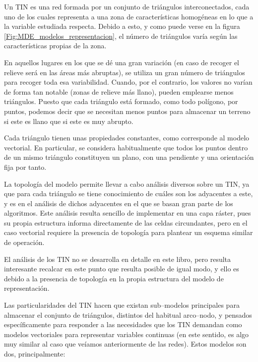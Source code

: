 \begin{multicols}{2}
Un TIN \cite{Peuker1978ASP} es una red formada por un conjunto de triángulos interconectados, cada uno de los cuales representa a una zona de características homogéneas en lo que a la variable estudiada respecta. Debido a esto, y como puede verse en la figura \ref{Fig:MDE_modelos_representacion}, el número de triángulos varía según las características propias de la zona. 

En aquellos lugares en los que se dé una gran variación (en caso de recoger el relieve será en las áreas más abruptas), se utiliza un gran número de triángulos para recoger toda esa variabilidad. Cuando, por el contrario, los valores no varían de forma tan notable (zonas de relieve más llano), pueden emplearse menos triángulos. Puesto que cada triángulo está formado, como todo polígono, por puntos, podemos decir que se necesitan menos puntos para almacenar un terreno si este es llano que si este es muy abrupto.

Cada triángulo tienen unas propiedades constantes, como corresponde al modelo vectorial. En particular, se considera habitualmente que todos los puntos dentro de un mismo triángulo constituyen un plano, con una pendiente y una orientación fija por tanto.

La topología del modelo permite llevar a cabo análisis diversos sobre un TIN, ya que para cada triángulo se tiene conocimiento de cuáles son los adyacentes a este, y es en el análisis de dichos adyacentes en el que se basan gran parte de los algoritmos. Este análisis resulta sencillo de implementar en una capa ráster, pues su propia estructura informa directamente de las celdas circundantes, pero en el caso vectorial requiere la presencia de topología para plantear un esquema similar de operación. 

El análisis de los TIN no se desarrolla en detalle en este libro, pero resulta interesante recalcar en este punto que resulta posible de igual modo, y ello es debido a la presencia de topología en la propia estructura del modelo de representación.

Las particularidades del TIN hacen que existan sub--modelos principales para almacenar el conjunto de triángulos, distintos del habitual arco--nodo, y pensados específicamente para responder a las necesidades que los TIN demandan como modelos vectoriales para representar variables continuas (en este sentido, es algo muy similar al caso que veíamos anteriormente de las redes). Estos modelos son dos, principalmente:


\end{multicols}
